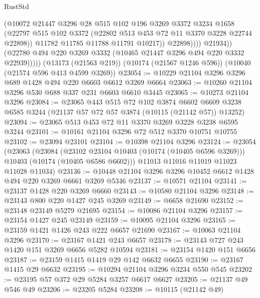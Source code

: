 \begin{lexlean}{RustStd}
\begin{coremodule}
                        (@10072
                          @21447
                          @3296
                          @28
                          @515
                          @102
                          @196
                          @3269
                          @3372
                          @3234
                          @1658
                          (@22797
                            @515
                            @102
                            @3372
                            (@22802 @513 @453 @72 @11 @3370 @3228 @22744 @22898))
                          @11782
                          @11785
                          @11788
                          @11791
                          @10217))
                      @22898))))
              @21934))
          (@22780 @494 @220 @3269 @3332 (@10465 @21447 @3296 @494 @220 @3332 @22939)))))
    (@13173 (@21563 @219))
    (@10174 (@21567 @1246 @596))
    (@10040 (@21574 @596 @413 @4599 @3269))
@23054 := @10229 @21104 @3296 @3296 @689 @1428 @494 @220 @6603 @6612 @3269 @6664
@23063 := @10260 @21104 @3296 @530 @688 @337 @231 @6603 @6610 @3445
@23065 := @10273 @21104 @3296
@23084 := @23065
    @443
    @515
    @72
    @102
    @3874
    @6602
    @6609
    @3238
    @6585
    @3244
    (@21137 @57 @72 @57 @3874 (@10115 (@21142 @57)) @13252)
@23094 := @23065 @513 @453 @72 @11 @3370 @3269 @3228 @3238 @6595 @3244
@23101 := @10161 @21104 @3296 @72 @512 @3370 @10751 @10755
@23102 := @23094 @23101
@23104 := @10398 @21104 @3296
@23124 := @23054
    (@23063
      (@23084
        (@23102 @23104 @10403 (@10174 (@10405 @6596 @3269)))
        @10403
        (@10174 (@10405 @6586 @6602)))
      @11013
      @11016
      @11019
      @11023
      @11028
      @11034)
@23136 := @10448 @21104 @3296 @3296 @10452 @6612 @1428 @494 @220 @3269 @6661 @3269 @5346
@23137 := @10571 @21104
@23141 := @23137 @1428 @220 @3269 @6660
@23143 := @10580 @21104 @3296
@23148 := @23143 @800 @220 @1427 @245 @3269
@23149 := @6658 @21690
@23152 := @23148 @23149 @5279 @21695
@23154 := @10086 @21104 @3296
@23157 := @23154 @1427 @245 @23149
@23159 := @10095 @21104 @3296
@23165 := @23159 @1421 @1426 @243 @222 @6657 @21690
@23167 := @10063 @21104 @3296
@23170 := @23167 @1421 @243 @6657
@23178 := @23143 @727 @243 @1420 @151 @3269 @6656 @5282 @10594
@23181 := @23154 @1420 @151 @6656
@23187 := @23159 @1415 @1419 @29 @142 @6632 @6655
@23190 := @23167 @1415 @29 @6632
@23195 := @10294 @21104 @3296 @3234 @550 @545
@23202 := @23195 @57 @372 @29 @5284 @3257 @6617 @6627
@23205 := @21137 @49 @546 @49
@23206 := @23205 @5284
@23208 := @10115 (@21142 @49)

\end{coremodule}
\end{lexlean}

